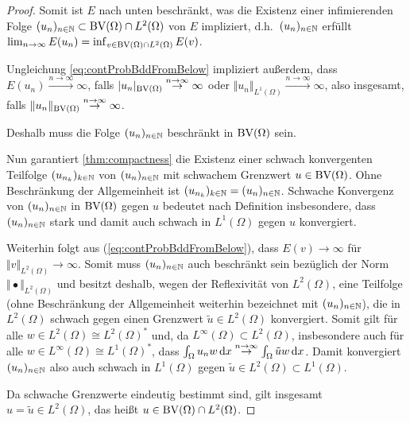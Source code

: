\begin{proof}
  Somit ist $E$ nach unten beschränkt, was die Existenz einer infimierenden
  Folge $(u_n)_{n\in\mathbb{N}}\subset\textup{BV}(\Omega)\cap L^2(\Omega)$ von $E$ 
  impliziert, d.h.\
  $(u_n)_{n\in\mathbb{N}}$ erfüllt $\lim_{n\rightarrow\infty}E(u_n) =
  \inf_{v\in\textup{BV}(\Omega)\cap L^2(\Omega)}E(v)$. 

  Ungleichung \eqref{eq:contProbBddFromBelow} impliziert außerdem, dass
  $E(u_n)\overset{n\to\infty}{\to}\infty$, falls
  $|u_n|_{\textup{BV}(\Omega)}\overset{n\to\infty}{\to}\infty$ oder 
  $\Vert u_n\Vert_{L^1(\Omega)}\overset{n\to\infty}{\to}\infty$, also 
  insgesamt, falls
  $\Vert u_n\Vert_{\textup{BV}(\Omega)}\overset{n\to\infty}{\to}\infty$.

  Deshalb muss die Folge $(u_n)_{n\in\mathbb{N}}$ beschränkt in $\textup{BV}(\Omega)$ sein.

  \medbreak
  Nun garantiert \cref{thm:compactness} die Existenz einer schwach konvergenten
  Teilfolge $(u_{n_k})_{k\in\mathbb{N}}$ von $(u_n)_{n\in\mathbb{N}}$ mit schwachem Grenzwert
  $u\in\textup{BV}(\Omega)$. Ohne Beschränkung der Allgemeinheit
  ist $(u_{n_k})_{k\in\mathbb{N}}=(u_n)_{n\in\mathbb{N}}$.
  Schwache Konvergenz von $(u_n)_{n\in\mathbb{N}}$ in $\textup{BV}(\Omega)$ gegen
  $u$ bedeutet nach Definition insbesondere, dass $(u_n)_{n\in\mathbb{N}}$ stark und
  damit auch schwach in $L^1(\Omega)$ gegen $u$ konvergiert.

  \medbreak
  Weiterhin folgt aus (\ref{eq:contProbBddFromBelow}), dass
  $E(v)\rightarrow\infty$ für
  $\Vert v\Vert_{L^2(\Omega)}\rightarrow\infty$. Somit muss $(u_n)_{n\in\mathbb{N}}$ 
  auch beschränkt sein bezüglich der Norm $\Vert\bullet\Vert_{L^2(\Omega)}$ und
  besitzt deshalb, wegen der Reflexivität von $L^2(\Omega)$,
  eine Teilfolge (ohne Beschränkung der Allgemeinheit weiterhin bezeichnet mit
  $(u_n)_{n\in\mathbb{N}}$), die
  in $L^2(\Omega)$ schwach gegen einen Grenzwert 
  $\tilde{u}\in L^2(\Omega)$ konvergiert. Somit gilt für alle $w\in
  L^2(\Omega)\cong L^2(\Omega)^\ast$ und, da $L^\infty(\Omega)\subset
  L^2(\Omega)$, insbesondere 
  auch für alle $w\in
  L^\infty(\Omega)\cong L^1(\Omega)^\ast$, dass 
  $\int_\Omega u_n w\,\mathrm{d}x \overset{n\to\infty}{\to}\int_\Omega \tilde{u} w\,\mathrm{d}x$. 
  Damit konvergiert $(u_n)_{n\in\mathbb{N}}$ also auch schwach in $L^1(\Omega)$ gegen
  $\tilde{u}\in L^2(\Omega)\subset L^1(\Omega)$. 

  \medbreak
  Da schwache Grenzwerte eindeutig bestimmt sind, gilt insgesamt $u=\tilde u
  \in L^2(\Omega)$, das heißt $u\in\textup{BV}(\Omega)\cap
  L^2(\Omega)$.



\end{proof}
